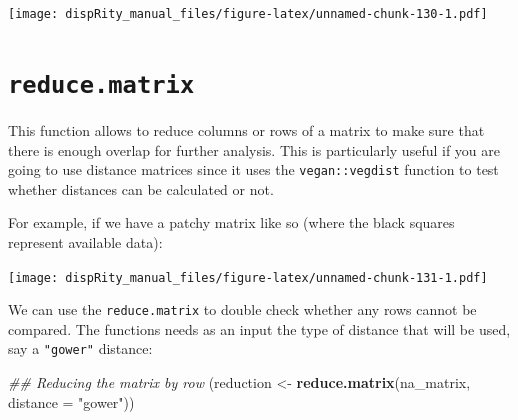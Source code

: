 \documentclass[]{book}
\newenvironment{Shaded}{\begin{snugshade}}{\end{snugshade}}
\newcommand{\CommentTok}[1]{\textcolor[rgb]{0.56,0.35,0.01}{\textit{#1}}}
\newcommand{\DataTypeTok}[1]{\textcolor[rgb]{0.13,0.29,0.53}{#1}}
\newcommand{\DecValTok}[1]{\textcolor[rgb]{0.00,0.00,0.81}{#1}}
\newcommand{\KeywordTok}[1]{\textcolor[rgb]{0.13,0.29,0.53}{\textbf{#1}}}
\newcommand{\NormalTok}[1]{#1}
\newcommand{\OperatorTok}[1]{\textcolor[rgb]{0.81,0.36,0.00}{\textbf{#1}}}
\newcommand{\OtherTok}[1]{\textcolor[rgb]{0.56,0.35,0.01}{#1}}
\newcommand{\StringTok}[1]{\textcolor[rgb]{0.31,0.60,0.02}{#1}}
\begin{document}
\texttt{[image: dispRity\_manual\_files/figure-latex/unnamed-chunk-130-1.pdf]}

\hypertarget{reduce.matrix}{%
\section{\texorpdfstring{\texttt{reduce.matrix}}{reduce.matrix}}\label{reduce.matrix}}

This function allows to reduce columns or rows of a matrix to make sure that there is enough overlap for further analysis.
This is particularly useful if you are going to use distance matrices since it uses the \texttt{vegan::vegdist} function to test whether distances can be calculated or not.

For example, if we have a patchy matrix like so (where the black squares represent available data):

\begin{Shaded}
\end{Shaded}

\texttt{[image: dispRity\_manual\_files/figure-latex/unnamed-chunk-131-1.pdf]}

We can use the \texttt{reduce.matrix} to double check whether any rows cannot be compared.
The functions needs as an input the type of distance that will be used, say a \texttt{"gower"} distance:

\begin{Shaded}
\begin{Highlighting}[]
\CommentTok{## Reducing the matrix by row}
\NormalTok{(reduction <-}\StringTok{ }\KeywordTok{reduce.matrix}\NormalTok{(na_matrix, }\DataTypeTok{distance =} \StringTok{"gower"}\NormalTok{))}
\end{Highlighting}
\end{Shaded}
\end{document}
